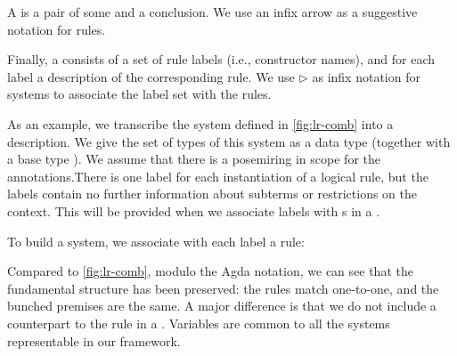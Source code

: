 
A  is a pair of some  and a
conclusion. We use an infix arrow as a suggestive notation for rules.


Finally, a  consists of a set of rule labels (i.e.,
constructor names), and for each label a description of the
corresponding rule. We use $\rhd$ as infix notation for systems to
associate the label set with the rules.



As an example, we transcribe the system defined in
\cref{fig:lr-comb} into a description.  We give the set of types of
this system as a data type  (together with a base
type \AgdaInductiveConstructor{$\iota$}). We assume that there is a
posemiring  in scope for the
annotations.There is one label for each instantiation of a logical
rule, but the labels contain no further information about subterms or
restrictions on the context. This will be provided when we associate
labels with s in a .

\noindent
\begin{minipage}[t]{0.5\textwidth}
\end{minipage}
\begin{minipage}[t]{0.5\textwidth}
\end{minipage}

To build a system, we associate with each label a rule:


Compared to \cref{fig:lr-comb}, modulo the Agda notation, we can see
that the fundamental structure has been preserved: the rules match
one-to-one, and the bunched premises are the same. A major difference
is that we do not include a counterpart to the
 rule in a
. Variables are common to all the systems
representable in our framework.

